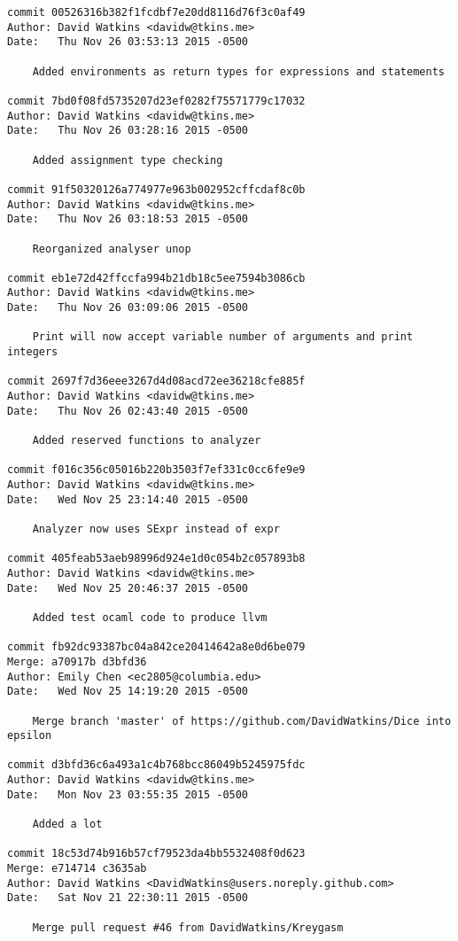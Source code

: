 \begin{verbatim}
commit 00526316b382f1fcdbf7e20dd8116d76f3c0af49
Author: David Watkins <davidw@tkins.me>
Date:   Thu Nov 26 03:53:13 2015 -0500

    Added environments as return types for expressions and statements

commit 7bd0f08fd5735207d23ef0282f75571779c17032
Author: David Watkins <davidw@tkins.me>
Date:   Thu Nov 26 03:28:16 2015 -0500

    Added assignment type checking

commit 91f50320126a774977e963b002952cffcdaf8c0b
Author: David Watkins <davidw@tkins.me>
Date:   Thu Nov 26 03:18:53 2015 -0500

    Reorganized analyser unop

commit eb1e72d42ffccfa994b21db18c5ee7594b3086cb
Author: David Watkins <davidw@tkins.me>
Date:   Thu Nov 26 03:09:06 2015 -0500

    Print will now accept variable number of arguments and print integers

commit 2697f7d36eee3267d4d08acd72ee36218cfe885f
Author: David Watkins <davidw@tkins.me>
Date:   Thu Nov 26 02:43:40 2015 -0500

    Added reserved functions to analyzer

commit f016c356c05016b220b3503f7ef331c0cc6fe9e9
Author: David Watkins <davidw@tkins.me>
Date:   Wed Nov 25 23:14:40 2015 -0500

    Analyzer now uses SExpr instead of expr

commit 405feab53aeb98996d924e1d0c054b2c057893b8
Author: David Watkins <davidw@tkins.me>
Date:   Wed Nov 25 20:46:37 2015 -0500

    Added test ocaml code to produce llvm

commit fb92dc93387bc04a842ce20414642a8e0d6be079
Merge: a70917b d3bfd36
Author: Emily Chen <ec2805@columbia.edu>
Date:   Wed Nov 25 14:19:20 2015 -0500

    Merge branch 'master' of https://github.com/DavidWatkins/Dice into epsilon

commit d3bfd36c6a493a1c4b768bcc86049b5245975fdc
Author: David Watkins <davidw@tkins.me>
Date:   Mon Nov 23 03:55:35 2015 -0500

    Added a lot

commit 18c53d74b916b57cf79523da4bb5532408f0d623
Merge: e714714 c3635ab
Author: David Watkins <DavidWatkins@users.noreply.github.com>
Date:   Sat Nov 21 22:30:11 2015 -0500

    Merge pull request #46 from DavidWatkins/Kreygasm
    

\end{verbatim}
